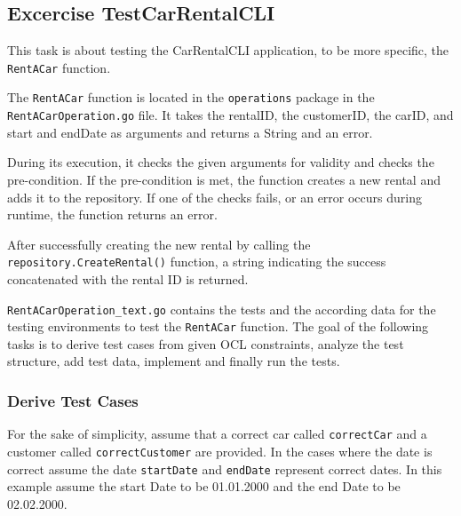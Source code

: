 \subsection{Excercise TestCarRentalCLI}
\label{sec:exercise_test_car_rental_cli}
This task is about testing the CarRentalCLI application, to be more specific, the \texttt{RentACar} function.

The \texttt{RentACar} function is located in the \texttt{operations} package in the \hfill \linebreak \texttt{RentACarOperation.go} file.
It takes the rentalID, the customerID, the carID, and start and endDate as arguments and returns a String and an error.

During its execution, it checks the given arguments for validity and checks the pre-condition.
If the pre-condition is met, the function creates a new rental and adds it to the repository.
If one of the checks fails, or an error occurs during runtime, the function returns an error.

After successfully creating the new rental by calling the \texttt{repository.CreateRental()} function, a string indicating the success concatenated with the rental ID is returned.

\texttt{RentACarOperation\_text.go} contains the tests and the according data for the testing environments to test the \texttt{RentACar} function.
The goal of the following tasks is to derive test cases from given OCL constraints, analyze the test structure, add test data, implement and finally run the tests.

\subsubsection*{Derive Test Cases}
For the sake of simplicity, assume that a correct car called \texttt{correctCar} and a customer called \texttt{correctCustomer} are provided.
In the cases where the date is correct assume the date \texttt{startDate} and \texttt{endDate} represent correct dates.
In this example assume the start Date to be 01.01.2000 and the end Date to be 02.02.2000.

